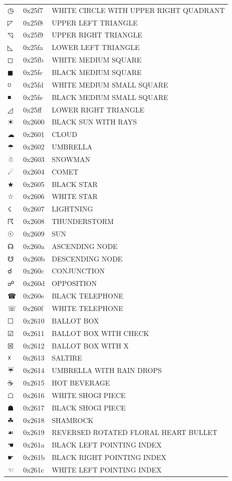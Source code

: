 \documentclass[12pt, twoside]{article}
\begin{document}
\begin{longtable}{L{1.0cm} L{2.0cm} >{\footnotesize}L{10cm}}
$◷$&0x25f7&WHITE CIRCLE WITH UPPER RIGHT QUADRANT\\
$◸$&0x25f8&UPPER LEFT TRIANGLE\\
$◹$&0x25f9&UPPER RIGHT TRIANGLE\\
$◺$&0x25fa&LOWER LEFT TRIANGLE\\
$◻$&0x25fb&WHITE MEDIUM SQUARE\\
$◼$&0x25fc&BLACK MEDIUM SQUARE\\
$◽$&0x25fd&WHITE MEDIUM SMALL SQUARE\\
$◾$&0x25fe&BLACK MEDIUM SMALL SQUARE\\
$◿$&0x25ff&LOWER RIGHT TRIANGLE\\
$☀$&0x2600&BLACK SUN WITH RAYS\\
$☁$&0x2601&CLOUD\\
$☂$&0x2602&UMBRELLA\\
$☃$&0x2603&SNOWMAN\\
$☄$&0x2604&COMET\\
$★$&0x2605&BLACK STAR\\
$☆$&0x2606&WHITE STAR\\
$☇$&0x2607&LIGHTNING\\
$☈$&0x2608&THUNDERSTORM\\
$☉$&0x2609&SUN\\
$☊$&0x260a&ASCENDING NODE\\
$☋$&0x260b&DESCENDING NODE\\
$☌$&0x260c&CONJUNCTION\\
$☍$&0x260d&OPPOSITION\\
$☎$&0x260e&BLACK TELEPHONE\\
$☏$&0x260f&WHITE TELEPHONE\\
$☐$&0x2610&BALLOT BOX\\
$☑$&0x2611&BALLOT BOX WITH CHECK\\
$☒$&0x2612&BALLOT BOX WITH X\\
$☓$&0x2613&SALTIRE\\
$☔$&0x2614&UMBRELLA WITH RAIN DROPS\\
$☕$&0x2615&HOT BEVERAGE\\
$☖$&0x2616&WHITE SHOGI PIECE\\
$☗$&0x2617&BLACK SHOGI PIECE\\
$☘$&0x2618&SHAMROCK\\
$☙$&0x2619&REVERSED ROTATED FLORAL HEART BULLET\\
$☚$&0x261a&BLACK LEFT POINTING INDEX\\
$☛$&0x261b&BLACK RIGHT POINTING INDEX\\
$☜$&0x261c&WHITE LEFT POINTING INDEX\\

\end{longtable}
\end{document}
